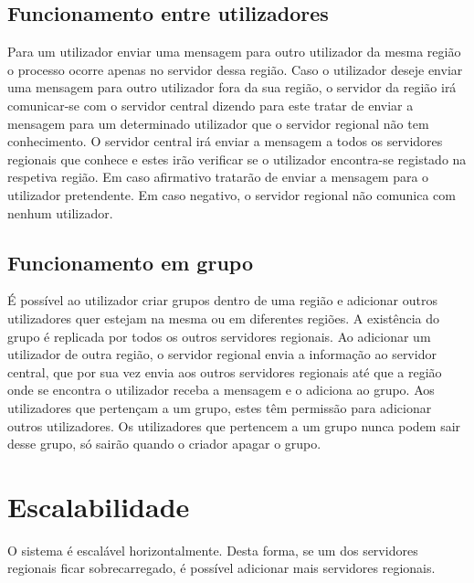 \subsection{Funcionamento entre utilizadores}
Para um utilizador enviar uma mensagem para outro utilizador da mesma região o processo ocorre apenas no servidor dessa região. Caso o utilizador deseje enviar uma mensagem para outro utilizador fora da sua região, o servidor da região irá comunicar-se com o servidor central dizendo para este tratar de enviar a mensagem para um determinado utilizador que o servidor regional não tem conhecimento. O servidor central irá enviar a mensagem a todos os servidores regionais que conhece e estes irão verificar se o utilizador encontra-se registado na respetiva região. Em caso afirmativo tratarão de enviar a mensagem para o utilizador pretendente. Em caso negativo, o servidor regional não comunica com nenhum utilizador.

\subsection{Funcionamento em grupo}
É possível ao utilizador criar grupos dentro de uma região e adicionar outros utilizadores quer estejam na mesma ou em diferentes regiões. A existência do grupo é replicada por todos os outros servidores regionais. Ao adicionar um utilizador de outra região, o servidor regional envia a informação ao servidor central, que por sua vez envia aos outros servidores regionais até que a região onde se encontra o utilizador receba a mensagem e o adiciona ao grupo. Aos utilizadores que pertençam a um grupo, estes têm permissão para adicionar outros utilizadores. Os utilizadores que pertencem a um grupo nunca podem sair desse grupo, só sairão quando o criador apagar o grupo.

\section{Escalabilidade}
O sistema é escalável horizontalmente. Desta forma, se um dos servidores regionais ficar sobrecarregado, é possível adicionar mais servidores regionais. 